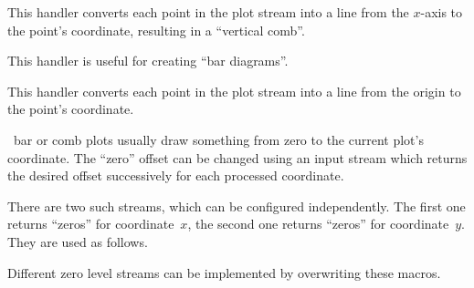 \begin{command}{\pgfplothandlerycomb}
    This handler converts each point in the plot stream into a line from the
    $x$-axis to the point's coordinate, resulting in a ``vertical comb''.

    This handler is useful for creating ``bar diagrams''.
\begin{codeexample}[]
\end{codeexample}
\end{command}

\begin{command}{\pgfplothandlerpolarcomb}
    This handler converts each point in the plot stream into a line from the
    origin to the point's coordinate.
\begin{codeexample}[]
\end{codeexample}
\end{command}

\pgfname\ bar or comb plots usually draw something from zero to the current
plot's coordinate. The ``zero'' offset can be changed using an input stream
which returns the desired offset successively for each processed coordinate.

There are two such streams, which can be configured independently. The first
one returns ``zeros'' for coordinate~$x$, the second one returns ``zeros'' for
coordinate~$y$. They are used as follows.
%
\begin{codeexample}
\pgfplotxzerolevelstreamstart
\pgfplotxzerolevelstreamnext %
\pgfplotxzerolevelstreamnext
\pgfplotxzerolevelstreamnext
\pgfplotxzerolevelstreamend
\end{codeexample}
%
\begin{codeexample}
\pgfplotyzerolevelstreamstart
\pgfplotyzerolevelstreamnext %
\pgfplotyzerolevelstreamend
\end{codeexample}
%
Different zero level streams can be implemented by overwriting these macros.

